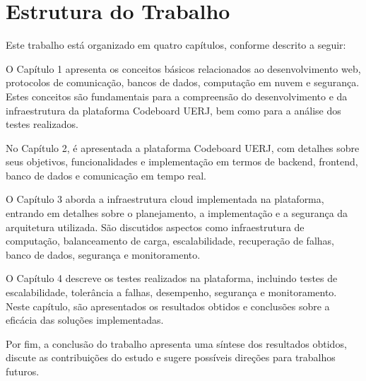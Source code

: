 \section*{Estrutura do Trabalho}

Este trabalho está organizado em quatro capítulos, conforme descrito a seguir:

O Capítulo 1 apresenta os conceitos básicos relacionados ao desenvolvimento web, protocolos de comunicação, bancos de dados, computação em nuvem e segurança. Estes conceitos são fundamentais para a compreensão do desenvolvimento e da infraestrutura da plataforma Codeboard UERJ, bem como para a análise dos testes realizados.

No Capítulo 2, é apresentada a plataforma Codeboard UERJ, com detalhes sobre seus objetivos, funcionalidades e implementação em termos de backend, frontend, banco de dados e comunicação em tempo real.

O Capítulo 3 aborda a infraestrutura cloud implementada na plataforma, entrando em detalhes sobre o planejamento, a implementação e a segurança da arquitetura utilizada. São discutidos aspectos como infraestrutura de computação, balanceamento de carga, escalabilidade, recuperação de falhas, banco de dados, segurança e monitoramento.

O Capítulo 4 descreve os testes realizados na plataforma, incluindo testes de escalabilidade, tolerância a falhas, desempenho, segurança e monitoramento. Neste capítulo, são apresentados os resultados obtidos e conclusões sobre a eficácia das soluções implementadas.

Por fim, a conclusão do trabalho apresenta uma síntese dos resultados obtidos, discute as contribuições do estudo e sugere possíveis direções para trabalhos futuros.


